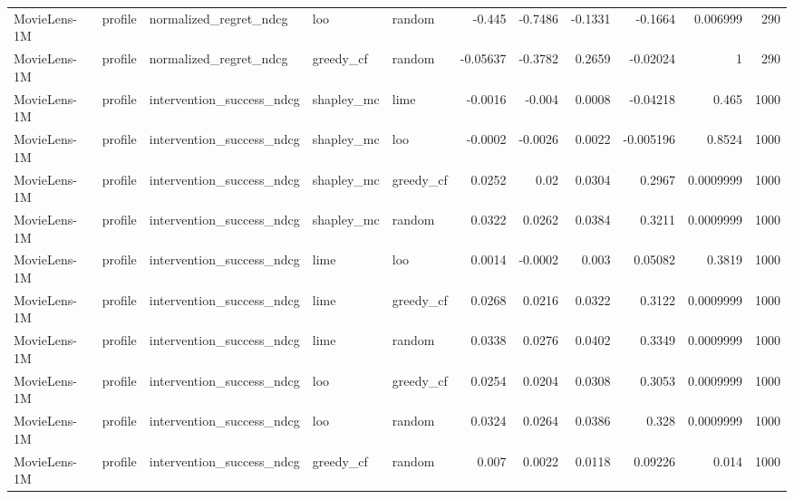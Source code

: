 \begin{table}[t]
\begin{tabular}{lllllrrrrrr}
MovieLens-1M & profile & normalized\_regret\_ndcg & loo & random & -0.445 & -0.7486 & -0.1331 & -0.1664 & 0.006999 & 290 \\
MovieLens-1M & profile & normalized\_regret\_ndcg & greedy\_cf & random & -0.05637 & -0.3782 & 0.2659 & -0.02024 & 1 & 290 \\
MovieLens-1M & profile & intervention\_success\_ndcg & shapley\_mc & lime & -0.0016 & -0.004 & 0.0008 & -0.04218 & 0.465 & 1000 \\
MovieLens-1M & profile & intervention\_success\_ndcg & shapley\_mc & loo & -0.0002 & -0.0026 & 0.0022 & -0.005196 & 0.8524 & 1000 \\
MovieLens-1M & profile & intervention\_success\_ndcg & shapley\_mc & greedy\_cf & 0.0252 & 0.02 & 0.0304 & 0.2967 & 0.0009999 & 1000 \\
MovieLens-1M & profile & intervention\_success\_ndcg & shapley\_mc & random & 0.0322 & 0.0262 & 0.0384 & 0.3211 & 0.0009999 & 1000 \\
MovieLens-1M & profile & intervention\_success\_ndcg & lime & loo & 0.0014 & -0.0002 & 0.003 & 0.05082 & 0.3819 & 1000 \\
MovieLens-1M & profile & intervention\_success\_ndcg & lime & greedy\_cf & 0.0268 & 0.0216 & 0.0322 & 0.3122 & 0.0009999 & 1000 \\
MovieLens-1M & profile & intervention\_success\_ndcg & lime & random & 0.0338 & 0.0276 & 0.0402 & 0.3349 & 0.0009999 & 1000 \\
MovieLens-1M & profile & intervention\_success\_ndcg & loo & greedy\_cf & 0.0254 & 0.0204 & 0.0308 & 0.3053 & 0.0009999 & 1000 \\
MovieLens-1M & profile & intervention\_success\_ndcg & loo & random & 0.0324 & 0.0264 & 0.0386 & 0.328 & 0.0009999 & 1000 \\
MovieLens-1M & profile & intervention\_success\_ndcg & greedy\_cf & random & 0.007 & 0.0022 & 0.0118 & 0.09226 & 0.014 & 1000 \\
\bottomrule
\end{tabular}
\end{table}
